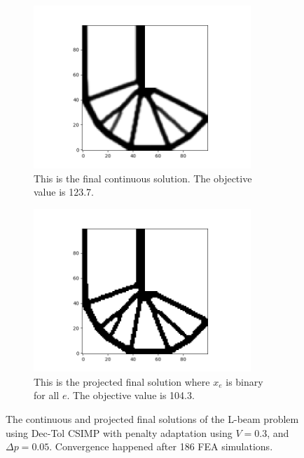   \begin{figure}
    \centering
    \begin{subfigure}[t]{0.45\textwidth}
      \includegraphics[width=0.9\textwidth]{images/adaptive_csimp/lbeam_dec_tol_csimp_03_0001_80_true_001_ip.png}
      \caption{This is the final continuous solution. The objective value is 123.7.}
      \label{fig:solution_final_lbeam_cont_csimp_true}
    \end{subfigure} \hfill
    \begin{subfigure}[t]{0.45\textwidth}
      \includegraphics[width=0.9\textwidth]{images/adaptive_csimp/lbeam_dec_tol_csimp_binary_03_0001_80_true.png}
      \caption{This is the projected final solution where $x_e$ is binary for all $e$. The objective value is 104.3.}
      \label{fig:solution_final_lbeam_binary_csimp_true}
    \end{subfigure}
    \caption{The continuous and projected final solutions of the L-beam problem using Dec-Tol CSIMP with penalty adaptation using $V = 0.3$, and $\Delta p = 0.05$. Convergence happened after 186 FEA simulations.}
    \label{fig:solution_final_lbeam_csimp_true}
  \end{figure}


